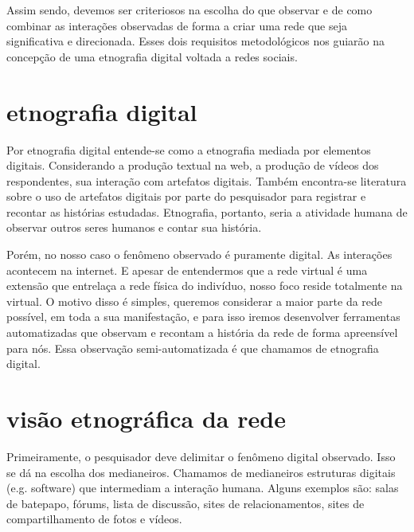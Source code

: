 \documentclass{article}
\begin{document}
Assim sendo, devemos ser criteriosos na escolha do que observar e de como
combinar as interações observadas de forma a criar uma rede que seja
significativa e direcionada. Esses dois requisitos metodológicos nos guiarão na
concepção de uma etnografia digital voltada a redes sociais.

\section{etnografia digital}

Por etnografia digital entende-se como a etnografia mediada por elementos
digitais. Considerando a produção textual na web, a produção de vídeos dos
respondentes, sua interação com artefatos digitais. Também encontra-se
literatura sobre o uso de artefatos digitais por parte do pesquisador para
registrar e recontar as histórias estudadas. Etnografia, portanto, seria a
atividade humana de observar outros seres humanos e contar sua história. 

Porém, no nosso caso o fenômeno observado é puramente digital. As interações
acontecem na internet. E apesar de entendermos que a rede virtual é uma extensão
que entrelaça a rede física do indivíduo, nosso foco reside totalmente na
virtual. O motivo disso é simples, queremos considerar a maior parte da rede
possível, em toda a sua manifestação, e para isso iremos desenvolver ferramentas
automatizadas que observam e recontam a história da rede de forma apreensível
para nós. Essa observação semi-automatizada é que chamamos de etnografia
digital.

\section{visão etnográfica da rede}

Primeiramente, o pesquisador deve delimitar o fenômeno digital observado. Isso
se dá na escolha dos medianeiros. Chamamos de medianeiros estruturas digitais
(e.g. software) que intermediam a interação humana. Alguns exemplos são: salas
de batepapo, fórums, lista de discussão, sites de relacionamentos, sites de
compartilhamento de fotos e vídeos.
\end{document}
